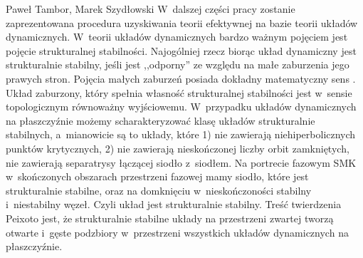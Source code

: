 \begin{artplenv2auth}{Paweł Tambor, Marek Szydłowski}
W~dalszej części pracy zostanie zaprezentowana procedura uzyskiwania teorii efektywnej na bazie teorii układów dynamicznych. W~teorii układów dynamicznych bardzo ważnym pojęciem jest pojęcie strukturalnej stabilności. Najogólniej rzecz biorąc układ dynamiczny jest strukturalnie stabilny, jeśli jest ,,odporny'' ze względu na małe zaburzenia jego prawych stron. Pojęcia małych zaburzeń posiada dokładny matematyczny sens
\parencite{tambor_czy_2017}.
Układ zaburzony, który spełnia własność strukturalnej stabilności jest w~sensie topologicznym równoważny wyjściowemu. W~przypadku układów dynamicznych na płaszczyźnie możemy scharakteryzować klasę układów strukturalnie stabilnych, a~mianowicie są to układy, które 1) nie zawierają niehiperbolicznych punktów krytycznych, 2) nie zawierają nieskończonej liczby orbit zamkniętych, nie zawierają separatrysy łączącej siodło z~siodłem. Na portrecie fazowym SMK w~skończonych obszarach przestrzeni fazowej mamy siodło, które jest strukturalnie stabilne, oraz na domknięciu w~nieskończoności stabilny i~niestabilny węzeł. Czyli układ jest strukturalnie stabilny. Treść twierdzenia Peixoto jest, że strukturalnie stabilne układy na przestrzeni zwartej tworzą otwarte i~gęste podzbiory w~przestrzeni wszystkich układów dynamicznych na płaszczyźnie.


\end{artplenv2auth}
